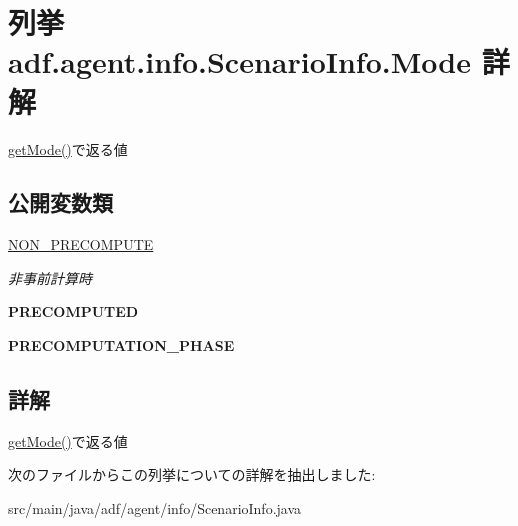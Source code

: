 \hypertarget{enumadf_1_1agent_1_1info_1_1ScenarioInfo_1_1Mode}{}\section{列挙 adf.\+agent.\+info.\+Scenario\+Info.\+Mode 詳解}
\label{enumadf_1_1agent_1_1info_1_1ScenarioInfo_1_1Mode}


\hyperlink{classadf_1_1agent_1_1info_1_1ScenarioInfo_a000d044bd9136cd5fea0f09ce3d80d4c}{get\+Mode()}で返る値  


\subsection*{公開変数類}
\begin{DoxyCompactItemize}
\item 
\hypertarget{enumadf_1_1agent_1_1info_1_1ScenarioInfo_1_1Mode_ae0a241687507036a1f7da42e13069082}{}\label{enumadf_1_1agent_1_1info_1_1ScenarioInfo_1_1Mode_ae0a241687507036a1f7da42e13069082} 
\hyperlink{enumadf_1_1agent_1_1info_1_1ScenarioInfo_1_1Mode_ae0a241687507036a1f7da42e13069082}{N\+O\+N\+\_\+\+P\+R\+E\+C\+O\+M\+P\+U\+TE}
\begin{DoxyCompactList}\small\item\em 非事前計算時 \end{DoxyCompactList}\item 
\hypertarget{enumadf_1_1agent_1_1info_1_1ScenarioInfo_1_1Mode_aaffc664fd77e30f945597f0a986429c4}{}\label{enumadf_1_1agent_1_1info_1_1ScenarioInfo_1_1Mode_aaffc664fd77e30f945597f0a986429c4} 
{\bfseries P\+R\+E\+C\+O\+M\+P\+U\+T\+ED}
\item 
\hypertarget{enumadf_1_1agent_1_1info_1_1ScenarioInfo_1_1Mode_a4ed92b7b20620daae3aa374d16b7e4a2}{}\label{enumadf_1_1agent_1_1info_1_1ScenarioInfo_1_1Mode_a4ed92b7b20620daae3aa374d16b7e4a2} 
{\bfseries P\+R\+E\+C\+O\+M\+P\+U\+T\+A\+T\+I\+O\+N\+\_\+\+P\+H\+A\+SE}
\end{DoxyCompactItemize}


\subsection{詳解}
\hyperlink{classadf_1_1agent_1_1info_1_1ScenarioInfo_a000d044bd9136cd5fea0f09ce3d80d4c}{get\+Mode()}で返る値 

次のファイルからこの列挙についての詳解を抽出しました\+:\begin{DoxyCompactItemize}
\item 
src/main/java/adf/agent/info/Scenario\+Info.\+java\end{DoxyCompactItemize}
